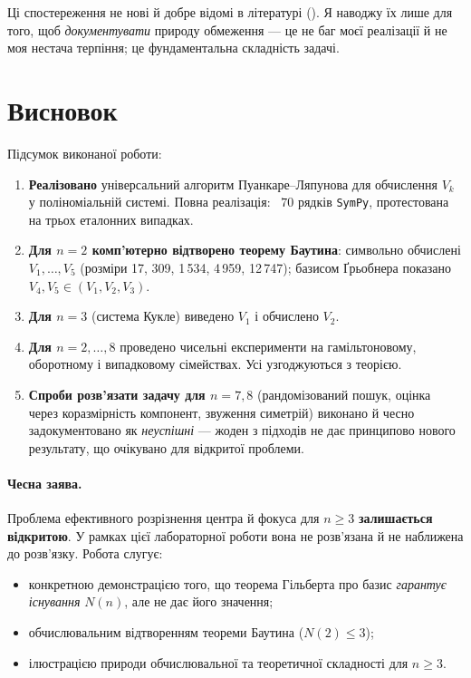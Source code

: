 \documentclass[12pt,a4paper]{article}
\begin{document}
Ці спостереження не нові й добре відомі в літературі (\cite{romanovski-shafer}). Я наводжу їх лише для того, щоб \emph{документувати} природу обмеження --- це не баг моєї реалізації й не моя нестача терпіння; це фундаментальна складність задачі.

\section{Висновок}\label{sec:conclusion}

Підсумок виконаної роботи:

\begin{enumerate}
    \item \textbf{Реалізовано} універсальний алгоритм Пуанкаре--Ляпунова для обчислення $V_k$ у поліноміальній системі. Повна реалізація: ~$70$ рядків \texttt{SymPy}, протестована на трьох еталонних випадках.
    \item \textbf{Для $n=2$ комп'ютерно відтворено теорему Баутина}: символьно обчислені $V_1,\dots,V_5$ (розміри 17, 309, 1\,534, 4\,959, 12\,747); базисом Ґрьобнера показано $V_4, V_5 \in (V_1, V_2, V_3)$.
    \item \textbf{Для $n=3$} (система Кукле) виведено $V_1$ і обчислено $V_2$.
    \item \textbf{Для $n=2,\dots,8$} проведено чисельні експерименти на гамільтоновому, оборотному і випадковому сімействах. Усі узгоджуються з теорією.
    \item \textbf{Спроби розв'язати задачу для $n=7, 8$} (рандомізований пошук, оцінка через коразмірність компонент, звуження симетрій) виконано й чесно задокументовано як \emph{неуспішні} --- жоден з підходів не дає принципово нового результату, що очікувано для відкритої проблеми.
\end{enumerate}

\paragraph{Чесна заява.} Проблема ефективного розрізнення центра й фокуса для $n\geq 3$ \textbf{залишається відкритою}. У рамках цієї лабораторної роботи вона не розв'язана й не наближена до розв'язку. Робота слугує:
\begin{itemize}
    \item конкретною демонстрацією того, що теорема Гільберта про базис \emph{гарантує існування} $N(n)$, але не дає його значення;
    \item обчислювальним відтворенням теореми Баутина ($N(2) \leq 3$);
    \item ілюстрацією природи обчислювальної та теоретичної складності для $n \geq 3$.
\end{itemize}
\end{document}
